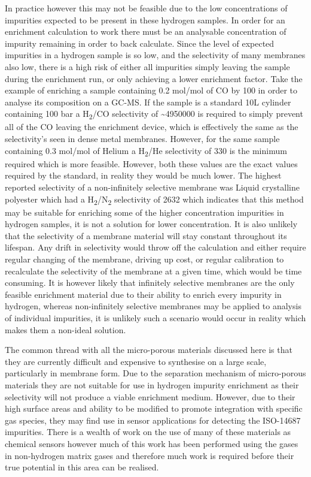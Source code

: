 In practice however this may not be feasible due to the low concentrations of impurities expected to be 
present in these hydrogen samples. In order for an enrichment calculation to work there must be an analysable 
concentration of impurity remaining in order to back calculate. Since the level of expected impurities in a 
hydrogen sample is so low, and the selectivity of many membranes also low, there is a high risk of either all 
impurities simply leaving the sample during the enrichment run, or only achieving a lower enrichment factor. 
Take the example of enriching a sample containing 0.2 \textmu mol/mol of CO by 100 in order to analyse its 
composition on 
a GC-MS. If the sample is a standard 10L cylinder containing 100 bar a H\textsubscript{2}/CO selectivity of 
\textasciitilde 4950000 is required to simply prevent all of the CO leaving the enrichment device, which is effectively the same as the selectivity’s seen in dense metal membranes. However, for the same sample containing 0.3 \textmu mol/mol 
of Helium a H\textsubscript{2}/He selectivity of 330 is the minimum required which is more feasible. However, both these values 
are the exact values required by the standard, in reality they would be much lower. The highest reported 
selectivity of a non-infinitely selective membrane was Liquid crystalline polyester which had a 
H\textsubscript{2}/N\textsubscript{2} 
selectivity of  2632 \cite{Weinkauf1992} which indicates that this method may be suitable for enriching some of the higher 
concentration impurities in hydrogen samples, it is not a solution for lower concentration. 
It is also unlikely that the selectivity of a membrane material will stay constant throughout its lifespan. 
Any drift in selectivity would throw off the calculation and either require regular changing of the membrane, 
driving up cost, or regular calibration to recalculate the selectivity of the membrane at a given time, which 
would be time consuming. It is however likely that infinitely selective membranes are the only feasible 
enrichment material due to their ability to enrich every impurity in hydrogen, whereas non-infinitely 
selective membranes may be applied to analysis of individual impurities, it is unlikely such a scenario 
would occur in reality which makes them a non-ideal solution. 

The common thread with all the micro-porous materials discussed here is that they are currently difficult and expensive to synthesise on a large scale, particularly in membrane form. Due to the separation mechanism of micro-porous materials they are not suitable for use in hydrogen impurity enrichment as their selectivity will not produce a viable enrichment medium. However, due to their high surface areas and ability to be modified to promote integration with specific gas species, they may find use in sensor applications for detecting the ISO-14687 impurities. There is a wealth of work on the use of many of these materials as chemical sensors however much of this work has been performed using the gases in non-hydrogen matrix gases and therefore much work is required before their true potential in this area can be realised. 

